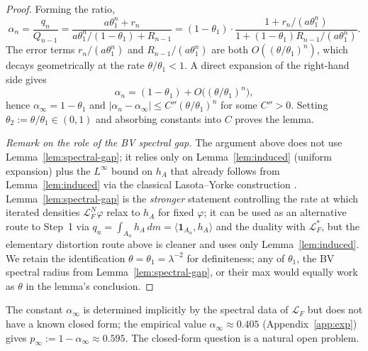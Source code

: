 \begin{proof}
Forming the ratio,
\[
    \alpha_n = \frac{q_n}{Q_{n-1}}
    = \frac{a \theta_1^n + r_n}{a \theta_1^n / (1 - \theta_1) + R_{n-1}}
    = (1 - \theta_1) \cdot \frac{1 + r_n / (a \theta_1^n)}{1 + (1 - \theta_1) R_{n-1} / (a \theta_1^n)}.
\]
The error terms $r_n / (a \theta_1^n)$ and $R_{n-1} / (a \theta_1^n)$
are both $O((\theta / \theta_1)^n)$, which decays geometrically at the
rate $\theta / \theta_1 < 1$. A direct expansion of the right-hand
side gives
\[
    \alpha_n = (1 - \theta_1) + O\bigl((\theta / \theta_1)^n\bigr),
\]
hence $\alpha_\infty = 1 - \theta_1$ and
$|\alpha_n - \alpha_\infty| \leq C'' (\theta / \theta_1)^n$ for some
$C'' > 0$. Setting $\theta_2 := \theta / \theta_1 \in (0, 1)$ and
absorbing constants into $C$ proves the lemma.

\smallskip
\emph{Remark on the role of the BV spectral gap.}
The argument above does not use Lemma~\ref{lem:spectral-gap}; it relies
only on Lemma~\ref{lem:induced} (uniform expansion) plus the $L^\infty$
bound on $h_A$ that already follows from Lemma~\ref{lem:induced} via
the classical Lasota--Yorke construction
\cite{lasota1973existence,baladi2000positive}. Lemma~\ref{lem:spectral-gap}
is the \emph{stronger} statement controlling the rate at which iterated
densities $\mathcal{L}_F^N \varphi$ relax to $h_A$ for fixed $\varphi$;
it can be used as an alternative route to Step~1 via
$q_n = \int_{A_n} h_A \, dm = \langle \mathbf{1}_{A_n}, h_A \rangle$ and
the duality with $\mathcal{L}_F^*$, but the elementary distortion route
above is cleaner and uses only Lemma~\ref{lem:induced}. We retain the
identification $\theta = \theta_1 = \lambda^{-2}$ for definiteness; any
of $\theta_1$, the BV spectral radius from Lemma~\ref{lem:spectral-gap},
or their max would equally work as $\theta$ in the lemma's conclusion.
\end{proof}

\begin{remark}
The constant $\alpha_\infty$ is determined implicitly by the spectral
data of $\mathcal{L}_F$ but does not have a known closed form; the
empirical value $\alpha_\infty \approx 0.405$ (Appendix~\ref{app:exp})
gives $p_\infty := 1 - \alpha_\infty \approx 0.595$. The closed-form
question is a natural open problem.
\end{remark}
